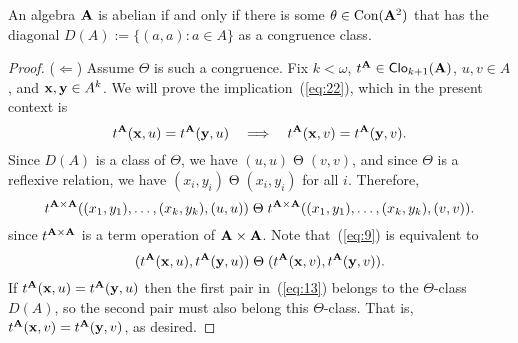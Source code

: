 \begin{lem}
 An algebra $\mathbf{A}$ is abelian if and only if there is some 
 $\theta \in \operatorname{Con} (\mathbf{A}^2)$ that has the diagonal $D(A):= \{(a,a): a \in A\}$ 
 as a congruence class.
\end{lem}
\begin{proof}
($\Leftarrow$) Assume $\Theta$ is such a congruence.  Fix 
  $k<\omega$,
  $t^{\mathbf{A}}\in \operatorname{\mathsf{Clo}}_{k+1}(\mathbf{A})$, 
  $u, v \in A$, and
  $\mathbf{x}, \mathbf{y} \in A^k$.
  We will prove the implication~(\ref{eq:22}), which in the present context is
\begin{equation*}
t^{\mathbf{A}}(\mathbf{x},u) = t^{\mathbf{A}}(\mathbf{y},u) \quad \Longrightarrow \quad 
t^{\mathbf{A}}(\mathbf{x},v) = t^{\mathbf{A}}(\mathbf{y},v).
\end{equation*}
Since $D(A)$ is a class of $\Theta$, we have 
  $(u,u) \mathrel{\Theta} (v,v)$, and since $\Theta$ is a reflexive relation, we have
  $(x_i,y_i)  \mathrel{\Theta} (x_i,y_i)$ for all $i$.  Therefore,
\begin{equation}
  \label{eq:9}  
  t^{\mathbf{A}\times \mathbf{A}}((x_1,y_1), \dots, (x_k,y_k), (u,u))
  \mathrel{\Theta}
  t^{\mathbf{A}\times \mathbf{A}}((x_1,y_1), \dots, (x_k,y_k), (v,v)).
\end{equation}
  since $t^{\mathbf{A} \times \mathbf{A}}$ is a term operation of $\mathbf{A}\times \mathbf{A}$.
  Note that~(\ref{eq:9}) is equivalent to
  \begin{equation}
    \label{eq:13}
    (t^{\mathbf{A}}(\mathbf{x}, u), t^{\mathbf{A}}(\mathbf{y},u))
    \mathrel{\Theta}
    (t^{\mathbf{A}}(\mathbf{x}, v), t^{\mathbf{A}}(\mathbf{y}, v)).
  \end{equation}
  If $t^{\mathbf{A}}(\mathbf{x}, u)= t^{\mathbf{A}}(\mathbf{y}, u)$ then 
  the first pair in~(\ref{eq:13}) belongs to the $\Theta$-class
  $D(A)$, so the second pair must also belong this $\Theta$-class.
  That is, $t^{\mathbf{A}}(\mathbf{x}, v)= t^{\mathbf{A}}(\mathbf{y}, v)$, as desired.

  \vskip2mm


\end{proof}
